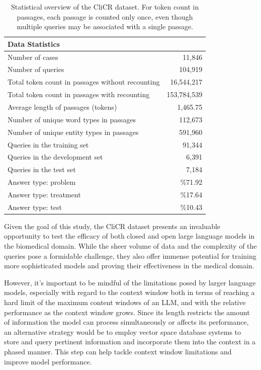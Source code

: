 \documentclass[onecolumn, conference]{IEEEtran}
\begin{document}
\begin{table}[ht]
  \centering
  \caption{Statistical overview of the CliCR dataset. For token count in passages, each passage is counted only once, even though multiple queries may be associated with a single passage. \cite{Suster2018}}
  \label{tab:data_statistics}
  \begin{tabular}{l r}
    \textbf{Data Statistics}                         &             \\
    \hline
    Number of cases                                  & 11,846      \\
    Number of queries                                & 104,919     \\
    Total token count in passages without recounting & 16,544,217  \\
    Total token count in passages with recounting    & 153,784,539 \\
    Average length of passages (tokens)              & 1,465.75    \\
    Number of unique word types in passages          & 112,673     \\
    Number of unique entity types in passages        & 591,960     \\
    Queries in the training set                      & 91,344      \\
    Queries in the development set                   & 6,391       \\
    Queries in the test set                          & 7,184       \\
    Answer type: problem                             & \%71.92     \\
    Answer type: treatment                           & \%17.64     \\
    Answer type: test                                & \%10.43     \\
  \end{tabular}
\end{table}

Given the goal of this study, the CliCR dataset presents an invaluable opportunity to test the efficacy of both closed and open large language models in the biomedical domain. While the sheer volume of data and the complexity of the queries pose a formidable challenge, they also offer immense potential for training more sophisticated models and proving their effectiveness in the medical domain.

However, it's important to be mindful of the limitations posed by larger language models, especially with regard to the context window both in terms of reaching a hard limit of the maximum content windows of an LLM, and with the relative performance as the context window grows. Since its length restricts the amount of information the model can process simultaneously or affects its performance, an alternative strategy would be to employ vector space database systems to store and query pertinent information and incorporate them into the context in a phased manner. This step can help tackle context window limitations and improve model performance.
\end{document}
